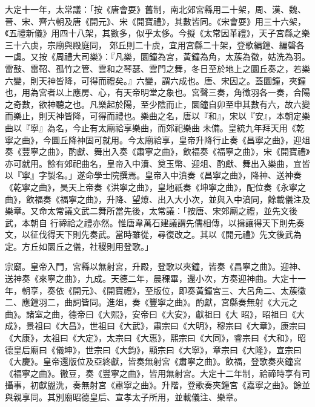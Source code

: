 \begin{pinyinscope}
 大定十一年，太常議：「按《唐會耍》舊制，南北郊宮縣用二十架，周、漢、魏、晉、宋、齊六朝及唐《開元》、宋《開寶禮》，其數皆同。《宋會耍》用三十六架，《五禮新儀》用四十八架，其數多，似乎太侈。今擬《太常因革禮》，天子宮縣之樂三十六虡，宗廟與殿庭同，
 郊丘則二十虡，宜用宮縣二十架，登歌編鐘、編磬各一虡。又按《周禮大司樂》：『凡樂，圜鐘為宮，黃鐘為角，太蔟為徵，姑洗為羽。雷鼓、雷鞀、孤竹之管、雲和之琴瑟、雲門之舞，冬日至於地上之圜丘奏之，若樂六變，則天神皆降，可得而禮矣。』六變，謂六成也。唐、宋因之。蓋圜鐘，夾鐘也，用為宮者以上應房、心，有天帝明堂之象也。宮聲三奏，角徵羽各一奏，合陽之奇數，欲神聽之也。凡樂起於陽，至少陰而止，圜鐘自卯至申其數有六，故六變而樂止，則天神皆降，可得而禮也。樂曲之名，唐以『和』，宋以『安』，本朝定樂曲以『寧』為名，今止有太廟祫享樂曲，而郊祀樂曲
 未備。皇統九年拜天用《乾寧之曲》，今圜丘降神固可就用。今太廟祫享，皇帝升降行止奏《昌寧之曲》，迎俎奏《豐寧之曲》，酌獻、舞出入奏《肅寧之曲》，飲福奏《福寧之曲》，宋《開寶禮》亦可就用。餘有郊祀曲名，皇帝入中濆、奠玉幣、迎俎、酌獻、舞出入樂曲，宜皆以『寧』字製名。」遂命學士院撰焉。皇帝入中濆奏《昌寧之曲》，降神、送神奏《乾寧之曲》，昊天上帝奏《洪寧之曲》，皇地祇奏《坤寧之曲》，配位奏《永寧之曲》，飲福奏《福寧之曲》，升降、望燎、出入大小次，並與入中濆同，餘載儀注及樂章。又命太常議文武二舞所當先後，太常議：「按唐、宋郊廟之禮，並先文後武，本朝自
 行禘祫之禮亦然。惟唐韋萬石建議謂先儒相傳，以揖讓得天下則先奏文，以征伐得天下則先奏武。當時雖從，尋復改之。其以《開元禮》先文後武為定。方丘如圜丘之儀，社稷則用登歌。」



 宗廟。皇帝入門，宮縣以無射宮，升殿，登歌以夾鐘，皆奏《昌寧之曲》。迎神、送神奏《來寧之曲》，九成。天德二年，晨稞畢，還小次，方奏迎神曲。大定十一年，朝享，奏依《開元》、《開寶禮》，至版位，即奏黃鐘宮三、大呂角二、太蔟徵二、應鐘羽二，曲詞皆同。進俎，奏《豐寧之曲》。酌獻，宮縣奏無射《大元之曲》。諸室之曲，德帝曰《大熙》，安帝曰《大安》，獻祖曰《大
 昭》，昭祖曰《大成》，景祖曰《大昌》，世祖曰《大武》，肅宗曰《大明》，穆宗曰《大章》，康宗曰《大康》，太祖曰《大定》，太宗曰《大惠》，熙宗曰《大同》，睿宗曰《大和》，昭德皇后廟曰《儀坤》，世宗曰《大鈞》，顯宗曰《大寧》，章宗曰《大隆》，宣宗曰《大慶》。皇帝還版位及亞終獻，皆奏無射宮《肅寧之曲》。飲福，登歌奏夾鐘宮《福寧之曲》。徹豆，奏《豐寧之曲》，皆用無射宮。大定十二年制，祫禘時享有司攝事，初獻盥洗，奏無射宮《肅寧之曲》。升階，登歌奏夾鐘宮《嘉寧之曲》。餘並與親享同。其別廟昭德皇后、宣孝太子所用，並載儀注、樂章。




\end{pinyinscope}
